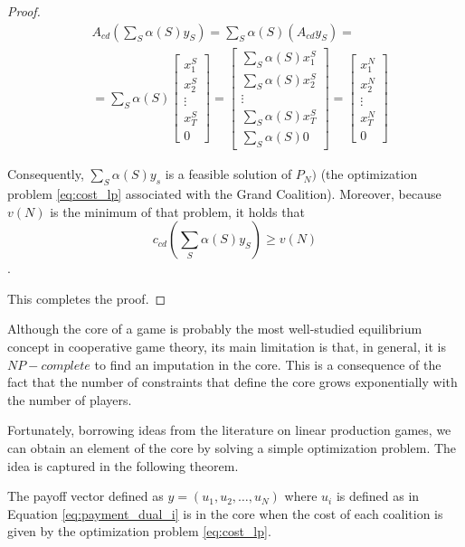 \documentclass[sigconf, table]{acmart}
\newcommand{\ccd}{c_{cd}}
\newcommand{\acd}{A_{cd}}
\begin{document}
\begin{proof}
\begin{equation}
  \begin{aligned}
&    \acd \left(\sum_S \alpha(S) y_S \right) = \sum_S \alpha(S) \left( \acd y_S \right) = \\ &= \sum_S \alpha(S) \begin{bmatrix} x^S_1 \\ x^S_2 \\ \vdots \\ x^S_T \\ 0 \end{bmatrix} = \begin{bmatrix} \sum_S \alpha(S) x^S_1 \\ \sum_S \alpha(S) x^S_2 \\ \vdots \\ \sum_S \alpha(S) x^S_T \\ \sum_S \alpha(S) 0 \end{bmatrix} = \begin{bmatrix} x^N_1 \\ x^N_2 \\ \vdots \\ x^N_T \\ 0 \end{bmatrix}
    \end{aligned}
\end{equation}

Consequently, $\sum_S \alpha(S) y_s$ is a feasible solution of $P_N)$ (the optimization problem \eqref{eq:cost_lp} associated with the Grand Coalition). Moreover, because $v(N)$ is the minimum of that problem, it holds that 
\[
  \ccd \left(\sum_S \alpha(S) y_S \right) \geq v(N)
 \].
 
 This completes the proof.

\end{proof}

Although the core of a game is probably the most well-studied equilibrium concept in cooperative game theory, its main limitation is that, in general, it is $NP-complete$ to find an imputation in the core. This is a consequence of the fact that the number of constraints that define the core grows exponentially with the number of players.

Fortunately, borrowing ideas from the literature on linear production games, we can obtain an element of the core by solving a simple optimization problem. The idea is captured in the following theorem.

\begin{theorem}\label{th:payoff_cd}

  The payoff vector defined as $y = (u_1, u_2, \dots, u_N)$ where $u_i$ is defined as in Equation \eqref{eq:payment_dual_i} is in the core when the cost of each coalition is given by the optimization problem \eqref{eq:cost_lp}.

\end{theorem}
\end{document}
